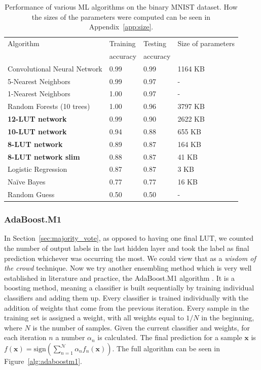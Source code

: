 \begin{table}[!htb]
    \begin{small}
        \begin{tabular}{llll}
        Algorithm & Training    & Testing    & Size of parameters \\
                  & accuracy    & accuracy   &                    \\ \hline
        Convolutional Neural Network & 0.99  & 0.99 & 1164 KB     \\
        5-Nearest Neighbors          & 0.99  & 0.97 & -           \\
        1-Nearest Neighbors          & 1.00  & 0.97 & -           \\
        Random Forests (10 trees)    & 1.00  & 0.96 & 3797 KB     \\
        \textbf{12-LUT network}      & 0.99  & 0.90 & 2622 KB     \\
        \textbf{10-LUT network}      & 0.94  & 0.88 & 655 KB      \\
        \textbf{8-LUT network}       & 0.89  & 0.87 & 164 KB      \\
        \textbf{8-LUT network slim}  & 0.88  & 0.87 & 41 KB       \\
        Logistic Regression          & 0.87  & 0.87 & 3 KB        \\
        Naïve Bayes                  & 0.77  & 0.77 & 16 KB       \\
        Random Guess                 & 0.50  & 0.50 & -  
        \end{tabular}
    \end{small}
    \caption{Performance of various ML algorithms on the binary MNIST dataset. How the sizes of the parameters were computed can be seen in Appendix~\ref{app:size}.}
\label{tab:ml_algos_on_bmnist}
\end{table}

\subsubsection{AdaBoost.M1} \label{sec:ada_boost}
In Section~\ref{sec:majority_vote}, as opposed to having one final LUT, we counted the number of output labels in the last hidden layer and took the label as final prediction whichever was occurring the most. We could view that as a \textit{wisdom of the crowd} technique. Now we try another ensembling method which is very well established in literature and practice, the AdaBoost.M1 algorithm \cite{adaboostm1}. It is a boosting method, meaning a classifier is built sequentially by training individual classifiers and adding them up. Every classifier is trained individually with the addition of weights that come from the previous iteration. Every sample in the training set is assigned a weight, with all weights equal to $1/N$ in the beginning, where $N$ is the number of samples. Given the current classifier and weights, for each iteration $n$ a number $\alpha_n$ is calculated. The final prediction for a sample $\bm{x}$ is $f(\bm{x}) = \text{sign}(\sum_{n=1}^{\mathcal{N}} \alpha_n f_n(\bm{x}))$. The full algorithm can be seen in Figure~\ref{alg:adaboostm1}.

